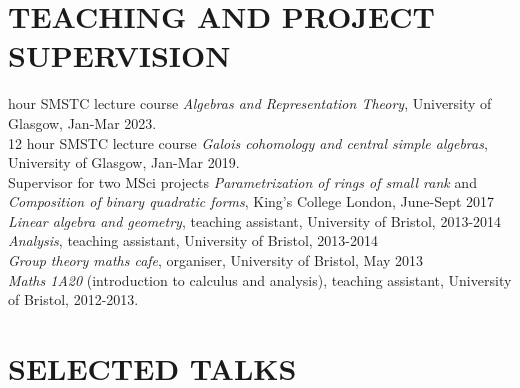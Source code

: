 \documentclass{res}
\begin{document}
\begin{resume}
\section{TEACHING AND PROJECT SUPERVISION}       

 hour SMSTC lecture course {\it Algebras and Representation Theory}, University of Glasgow, Jan-Mar 2023.\medskip\\
12 hour SMSTC lecture course {\it Galois cohomology and central simple algebras}, University of Glasgow, Jan-Mar 2019.\medskip\\
Supervisor for two MSci projects {\it Parametrization of rings of small rank} 
\textup{and} {\it Composition of binary quadratic forms}\textup{, King's College London, June-Sept 2017} \medskip\\   
    {\it Linear algebra and geometry}, teaching assistant, University of Bristol, 2013-2014 \medskip\\         
    {\it Analysis}, teaching assistant, University of Bristol, 2013-2014 \medskip \\
{\it Group theory maths cafe}, organiser, University of Bristol, May 2013 \medskip \\
    {\it Maths 1A20} (introduction to calculus and analysis), teaching assistant, University of Bristol, 2012-2013. 
 

\section{SELECTED TALKS}         
        

\end{resume}
\end{document}

